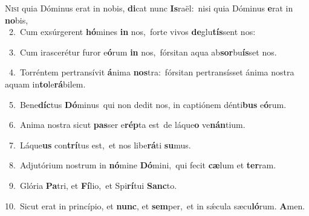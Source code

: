 \lettrine{\initial\textcolor{\initialcolor}{N}}{isi} quia Dóminus erat in nobis, \textbf{di}\-cat nunc \textbf{Is}\-raël:~\star nisi quia Dóminus \textbf{e}\-rat in \textbf{no}\-bis,\\
{\numbfont\textcolor{\numbcolor}{~2.}}~Cum exsúrgerent \textbf{hó}\-mines \textbf{in} nos,~\star forte vivos \textbf{de}\-glu\-\textbf{tís}\-sent nos:\par
{\numbfont\textcolor{\numbcolor}{~3.}}~Cum irascerétur furor e\-\textbf{ó}\-rum \textbf{in} nos,~\star fórsitan aqua ab\-\textbf{sor}\-bu\-\textbf{ís}\-set nos.\par
{\numbfont\textcolor{\numbcolor}{~4.}}~Torréntem pertransívit \textbf{á}\-nima \textbf{nos}\-tra:~\star fórsitan pertransísset ánima nostra aquam in\-\textbf{to}\-le\-\textbf{rá}\-bilem.\par
{\numbfont\textcolor{\numbcolor}{~5.}}~Bene\-\textbf{díc}\-tus \textbf{Dó}\-minus~\star qui non dedit nos, in captiónem dénti\textbf{bus} e\-\textbf{ó}\-rum.\par
{\numbfont\textcolor{\numbcolor}{~6.}}~Anima nostra sicut \textbf{pas}\-ser e\-\textbf{rép}\-ta est~\star de láque\textbf{o} ve\-\textbf{nán}\-tium.\par
{\numbfont\textcolor{\numbcolor}{~7.}}~Láque\textbf{us} con\-\textbf{trí}\-tus est,~\star et nos libe\-\textbf{rá}\-ti \textbf{su}\-mus.\par
{\numbfont\textcolor{\numbcolor}{~8.}}~Adjutórium nostrum in \textbf{nó}\-mine \textbf{Dó}\-mini,~\star qui fecit \textbf{cæ}\-lum et \textbf{ter}\-ram.\par
{\numbfont\textcolor{\numbcolor}{~9.}}~Glória \textbf{Pa}\-tri, et \textbf{Fí}\-lio,~\star et Spi\-\textbf{rí}\-tui \textbf{Sanc}\-to.\par
{\numbfont\textcolor{\numbcolor}{10.}}~Sicut erat in princípio, et \textbf{nunc}\-, et \textbf{sem}\-per,~\star et in sǽcula sæcu\-\textbf{ló}\-rum. \textbf{A}\-men.\par
